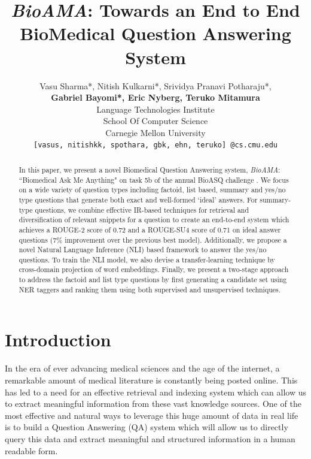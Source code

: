 \documentclass[11pt,a4paper]{article}
\title{\textit{BioAMA}: Towards an End to End BioMedical Question Answering System}
\author{Vasu Sharma*, Nitish Kulkarni*, Srividya Pranavi Potharaju*, \\\textbf{Gabriel Bayomi*, Eric Nyberg, Teruko Mitamura}\\
  Language Technologies Institute \\
  School Of Computer Science \\
  Carnegie Mellon University \\
  {\tt [vasus, nitishkk, spothara, gbk, ehn, teruko] @cs.cmu.edu}\\
  }
\date{}
\begin{document}
\maketitle
\begin{abstract}
In this paper, we present a novel Biomedical Question Answering system, \textit{BioAMA}: ``Biomedical Ask Me Anything" on task 5b of the annual BioASQ challenge \cite{bioasq}. We focus on a wide variety of question types including factoid, list based, summary and yes/no type questions that generate both exact and well-formed `ideal' answers. For summary-type questions, we combine effective IR-based techniques for retrieval and diversification of relevant snippets for a question to create an end-to-end system which achieves a ROUGE-2 score of 0.72 and a ROUGE-SU4 score of 0.71 on ideal answer questions (7\%  improvement over the previous best model). Additionally, we propose a novel Natural Language Inference (NLI) based framework to answer the yes/no questions. To train the NLI model, we also devise a transfer-learning technique by cross-domain projection of word embeddings. Finally, we present a two-stage approach to address the factoid and list type questions by first generating a candidate set using NER taggers and ranking them using both supervised and unsupervised techniques.

\end{abstract}

\section{Introduction}
In the era of ever advancing medical sciences and the age of the internet, a remarkable amount of medical literature is constantly being posted online. This has led to a need for an effective retrieval and indexing system which can allow us to extract meaningful information from these vast knowledge sources. One of the most effective and natural ways to leverage this huge amount of data in real life is to build a Question Answering (QA) system which will allow us to directly query this data and extract meaningful and structured information in a human readable form. 
\end{document}
